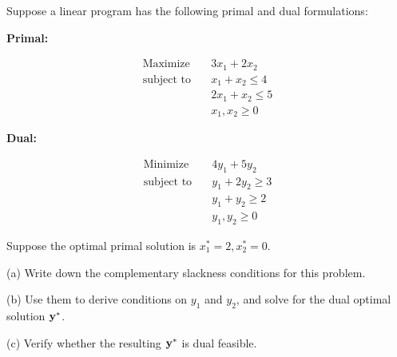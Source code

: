 \begin{ex}

Suppose a linear program has the following primal and dual formulations:

\textbf{Primal:}

$$
\begin{aligned}
\text{Maximize} \quad & 3x_1 + 2x_2 \\
\text{subject to} \quad & x_1 + x_2 \leq 4 \\
& 2x_1 + x_2 \leq 5 \\
& x_1, x_2 \geq 0
\end{aligned}
$$

\textbf{Dual:}

$$
\begin{aligned}
\text{Minimize} \quad & 4y_1 + 5y_2 \\
\text{subject to} \quad & y_1 + 2y_2 \geq 3 \\
& y_1 + y_2 \geq 2 \\
& y_1, y_2 \geq 0
\end{aligned}
$$

Suppose the optimal primal solution is $x_1^* = 2, x_2^* = 0$.

(a) Write down the complementary slackness conditions for this problem.

(b) Use them to derive conditions on $y_1$ and $y_2$, and solve for the dual optimal solution $\mathbf{y}^*$.

(c) Verify whether the resulting $\mathbf{y}^*$ is dual feasible.
\end{ex}




